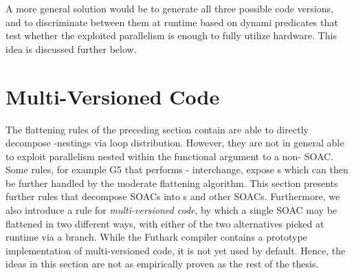 A more general solution would be to generate all three possible code
versions, and to discriminate between them at runtime based on dynami
predicates that test whether the exploited parallelism is enough to
fully utilize hardware.  This idea is discussed further below.

\section{Multi-Versioned Code}
\label{sec:multi-versioned-code}

The flattening rules of the preceding section contain are able to
directly decompose -nestings via loop distribution.  However,
they are not in general able to exploit parallelism nested within the
functional argument to a non- SOAC.  Some rules, for example
G5 that performs - interchange, expose s
which can then be further handled by the moderate flattening
algorithm.  This section presents further rules that decompose SOACs
into s and other SOACs.  Furthermore, we also introduce a rule
for \textit{multi-versioned code}, by which a single SOAC may be
flattened in two different ways, with either of the two alternatives
picked at runtime via a branch.  While the Futhark compiler contains a
prototype implementation of multi-versioned code, it is not yet used
by default.  Hence, the ideas in this section are not as empirically
proven as the rest of the thesis.


